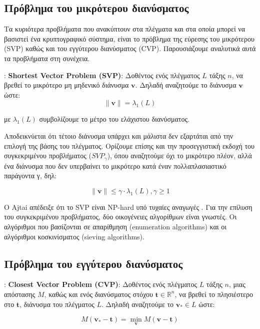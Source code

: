 \subsection{Πρόβλημα του μικρότερου διανύσματος}

Τα κυριότερα προβλήματα που ανακύπτουν στα πλέγματα και στα οποία μπορεί να βασιστεί ένα κρυπτογραφικό σύστημα, είναι το πρόβλημα της εύρεσης του μικρότερου (SVP) καθώς και του εγγύτερου διανύσματος (CVP). Παρουσιάζουμε αναλυτικά αυτά τα προβλήματα στη συνέχεια. 

\begin{definition}:
 \textbf{Shortest Vector Problem (SVP)}: Δοθέντος ενός πλέγματος $ L $ τάξης $ n $, να βρεθεί το μικρότερο μη μηδενικό διάνυσμα $ \bm v $. Δηλαδή αναζητούμε το διάνυσμα $ \bm v $ ώστε: 
 $$ \| \bm v \| = \lambda_1(L) $$
 
 με $ \lambda_1(L) $ συμβολίζουμε το μέτρο του ελάχιστου διανύσματος.
\end{definition}

Αποδεικνύεται ότι τέτοιο διάνυσμα υπάρχει και μάλιστα δεν εξαρτάται από την επιλογή της βάσης του πλέγματος. Ορίζουμε επίσης και την προσεγγιστική εκδοχή του συγκεκριμένου προβλήματος ($ SVP_{\gamma} $), όπου αναζητούμε όχι το μικρότερο πλέον, αλλά ένα διάνυσμα που δεν υπερβαίνει το μικρότερο κατά έναν πολλαπλασιαστικό παράγοντα γ, δηλ: 

$$ \| \bm v \| \leq \gamma \cdot \lambda_1(L),  \gamma \geq 1$$

Ο \lt Ajtai απέδειξε ότι το SVP είναι NP-hard υπό τυχαίες αναγωγές \cite{Ajtai}. Για την επίλυση του συγκεκριμένου προβλήματος, δύο οικογένειες αλγορίθμων είναι γνωστές. Οι αλγόριθμοι που βασίζονται σε απαρίθμηση (\lt enumeration algorithms) και οι αλγόριθμοι κοσκινίσματος (sieving algorithms). 

\subsection{Πρόβλημα του εγγύτερου διανύσματος}

\begin{definition}:
 \textbf{Closest Vector Problem (CVP)}: Δοθέντος ενός πλέγματος $ L $ τάξης $ n $, μιας απόστασης $ Μ $, καθώς και ενός διανύσματος στόχου $\bm t \in \mathbb{R}^n $, να βρεθεί το πλησιέστερο στο $\bm t $, διάνυσμα του πλέγματος $ L $.  Δηλαδή αναζητούμε το $\bm v_* \in L $ ώστε: 
 
 $$ Μ(\bm v_*- \bm t) = \min_{\bm v} M(\bm v-\bm t) $$
 
\end{definition}

